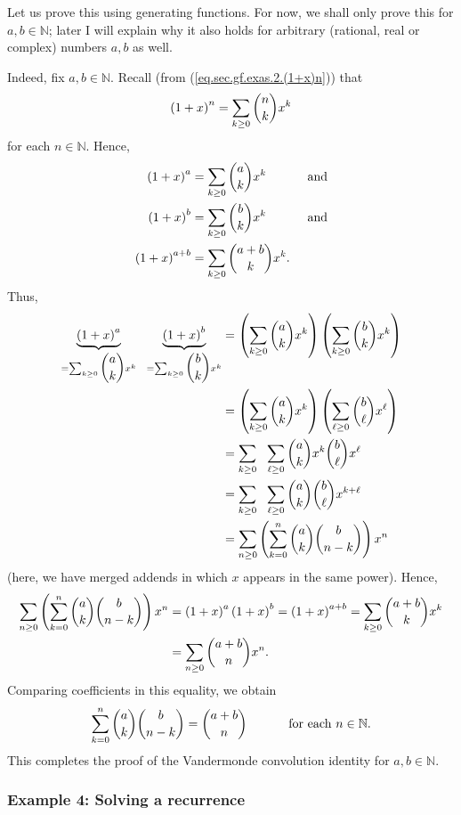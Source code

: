 Let us prove this using generating functions. For now, we shall only prove
this for $a,b\in\mathbb{N}$; later I will explain why it also holds for
arbitrary (rational, real or complex) numbers $a,b$ as well.

Indeed, fix $a,b\in\mathbb{N}$. Recall (from (\ref{eq.sec.gf.exas.2.(1+x)n}))
that
\[
\left(  1+x\right)  ^{n}=\sum_{k\geq0}\dbinom{n}{k}x^{k}%
\]
for each $n\in\mathbb{N}$. Hence,%
\begin{align*}
\left(  1+x\right)  ^{a}  &  =\sum_{k\geq0}\dbinom{a}{k}x^{k}%
\ \ \ \ \ \ \ \ \ \ \text{and}\\
\left(  1+x\right)  ^{b}  &  =\sum_{k\geq0}\dbinom{b}{k}x^{k}%
\ \ \ \ \ \ \ \ \ \ \text{and}\\
\left(  1+x\right)  ^{a+b}  &  =\sum_{k\geq0}\dbinom{a+b}{k}x^{k}.
\end{align*}
Thus,
\begin{align*}
\underbrace{\left(  1+x\right)  ^{a}}_{=\sum_{k\geq0}\dbinom{a}{k}x^{k}%
}\ \ \underbrace{\left(  1+x\right)  ^{b}}_{=\sum_{k\geq0}\dbinom{b}{k}x^{k}}
&  =\left(  \sum_{k\geq0}\dbinom{a}{k}x^{k}\right)  \left(  \sum_{k\geq
0}\dbinom{b}{k}x^{k}\right) \\
&  =\left(  \sum_{k\geq0}\dbinom{a}{k}x^{k}\right)  \left(  \sum_{\ell\geq
0}\dbinom{b}{\ell}x^{\ell}\right) \\
&  =\sum_{k\geq0}\ \ \sum_{\ell\geq0}\dbinom{a}{k}x^{k}\dbinom{b}{\ell}%
x^{\ell}\\
&  =\sum_{k\geq0}\ \ \sum_{\ell\geq0}\dbinom{a}{k}\dbinom{b}{\ell}x^{k+\ell}\\
&  =\sum_{n\geq0}\left(  \sum_{k=0}^{n}\dbinom{a}{k}\dbinom{b}{n-k}\right)
x^{n}%
\end{align*}
(here, we have merged addends in which $x$ appears in the same power). Hence,%
\begin{align*}
\sum_{n\geq0}\left(  \sum_{k=0}^{n}\dbinom{a}{k}\dbinom{b}{n-k}\right)  x^{n}
&  =\left(  1+x\right)  ^{a}\left(  1+x\right)  ^{b}=\left(  1+x\right)
^{a+b}=\sum_{k\geq0}\dbinom{a+b}{k}x^{k}\\
&  =\sum_{n\geq0}\dbinom{a+b}{n}x^{n}.
\end{align*}
Comparing coefficients in this equality, we obtain%
\[
\sum_{k=0}^{n}\dbinom{a}{k}\dbinom{b}{n-k}=\dbinom{a+b}{n}%
\ \ \ \ \ \ \ \ \ \ \text{for each }n\in\mathbb{N}.
\]
This completes the proof of the Vandermonde convolution identity for
$a,b\in\mathbb{N}$.

\subsubsection{Example 4: Solving a recurrence}

